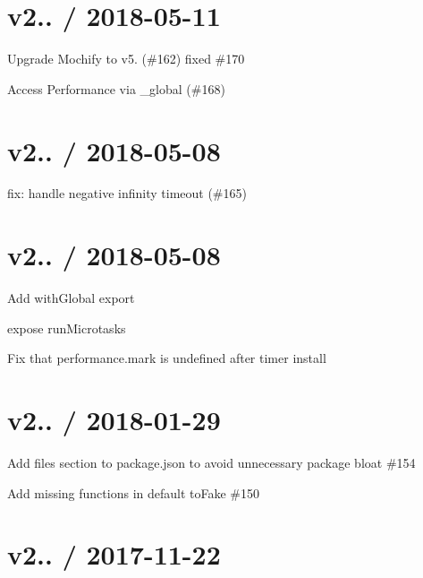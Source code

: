 \section*{v2.. / 2018-\/05-\/11 }


\begin{DoxyItemize}
\item Upgrade Mochify to v5. (\#162) fixed \#170
\item Access {\ttfamily Performance} via {\ttfamily \+\_\+global} (\#168)
\end{DoxyItemize}

\section*{v2.. / 2018-\/05-\/08 }


\begin{DoxyItemize}
\item fix\+: handle negative infinity timeout (\#165)
\end{DoxyItemize}

\section*{v2.. / 2018-\/05-\/08 }


\begin{DoxyItemize}
\item Add {\ttfamily with\+Global} export
\item expose run\+Microtasks
\item Fix that performance.\+mark is undefined after timer install
\end{DoxyItemize}

\section*{v2.. / 2018-\/01-\/29 }


\begin{DoxyItemize}
\item Add files section to package.\+json to avoid unnecessary package bloat \#154
\item Add missing functions in default {\ttfamily to\+Fake} \#150
\end{DoxyItemize}

\section*{v2.. / 2017-\/11-\/22 }


